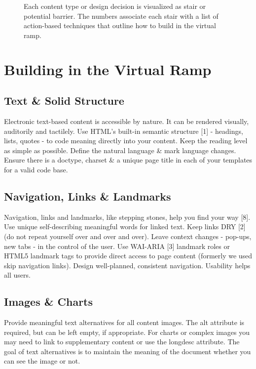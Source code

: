 \documentclass{acm_proc_article-sp}
\begin{document}
\begin{figure*}
\centering
{}
\caption{Each content type or design decision is visualized as stair or potential barrier. The numbers associate each stair with a list of action-based techniques that outline how to build in the virtual ramp.}
\end{figure*}

\section{Building in the {\secit Virtual} Ramp}

\subsection{Text \& Solid Structure}

Electronic text-based content is accessible by nature. It can be rendered visually, auditorily and tactilely. Use HTML's built-in semantic structure [1] - headings, lists, quotes - to code meaning directly into your content. Keep the reading level as simple as possible. Define the natural language \& mark language changes. Ensure there is a doctype, charset \& a unique page title in each of your templates for a valid code base.

\subsection{Navigation, Links \& Landmarks}
Navigation, links and landmarks, like stepping stones, help you find your way [8]. Use unique self-describing meaningful words for linked text. Keep links DRY [2] (do not repeat yourself over and over and over). Leave context changes - pop-ups, new tabs - in the control of the user. Use WAI-ARIA [3] landmark roles or HTML5 landmark tags to provide direct access to page content (formerly we used skip navigation links). Design well-planned, consistent navigation. Usability helps all users.

\subsection{Images \& Charts}
Provide meaningful text alternatives for all content images. The alt attribute is required, but can be left empty, if appropriate. For charts or complex images you may need to link to supplementary content or use the longdesc attribute. The goal of text alternatives is to maintain the meaning of the document whether you can see the image or not.
\end{document}
